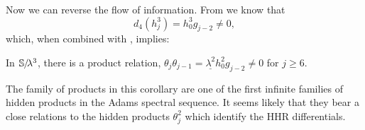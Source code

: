 Now we can reverse the flow of information.
From  we know that
\[ d_4(h_j^3) = h_0^3g_{j-2} \neq 0, \]
which, when combined with , implies:


\begin{cor}
  In $\operatorname{\mathbb{S}}\hspace{-2.2pt}/\!\lambda^3$, there is a product relation, $\theta_j\theta_{j-1} = \underline{\lambda^2} h_0^2g_{j-2} \neq 0 $ for $j \geq 6$.
\end{cor}

The family of products in this corollary are one of the first infinite families of hidden products in the Adams spectral sequence. It seems likely that they bear a close relations to the hidden products $\theta_j^2$ which identify the HHR differentials.

